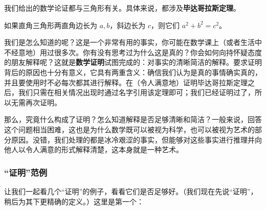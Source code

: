 我们给出的数学论证都与三角形有关。具体来说，都涉及\textbf{毕达哥拉斯定理}。

\begin{theorem}[毕达哥拉斯定理] \label{thm:pythagorean}
    如果直角三角形两直角边长为 $a,b$，斜边长为 $c$，则它们 $a^2+b^2=c^2$。
\end{theorem}

\begin{center}
\end{center}

我们是怎么知道的呢？这是一个非常有用的事实，你可能在数学课上（或者生活中不经意地）用过很多次。你有没有思考过为什么这是真的？你会如何向持怀疑态度的朋友解释呢？这就是\textbf{数学证明}试图完成的：对事实的清晰简洁的解释。要求证明背后的原因也十分有意义，它具有两重含义：确信我们认为是真的事情确实真的，并且要使用时不必每次都其进行解释。在（令人满意地）证明毕达哥拉斯定理之后，我们只需在相关情况出现时通过名字引用该定理即可；我们已经证明过了，所以无需再次证明。

那么，究竟什么构成了证明？怎么知道解释是否足够清晰和简洁？一般来说，回答这个问题相当困难，这也是为什么数学既可以被视为科学，也可以被视为艺术的部分原因。没错，我们处理的都是冰冷艰涩的事实，但能够对这些事实进行推理并向他人以令人满意的形式解释清楚，这本身就是一种艺术。

\subsubsection*{``证明''范例}

让我们一起看几个``证明''的例子，看看它们是否足够好。（我们现在先说``证明''，稍后为其下更精确的定义。）这里是第一个：

